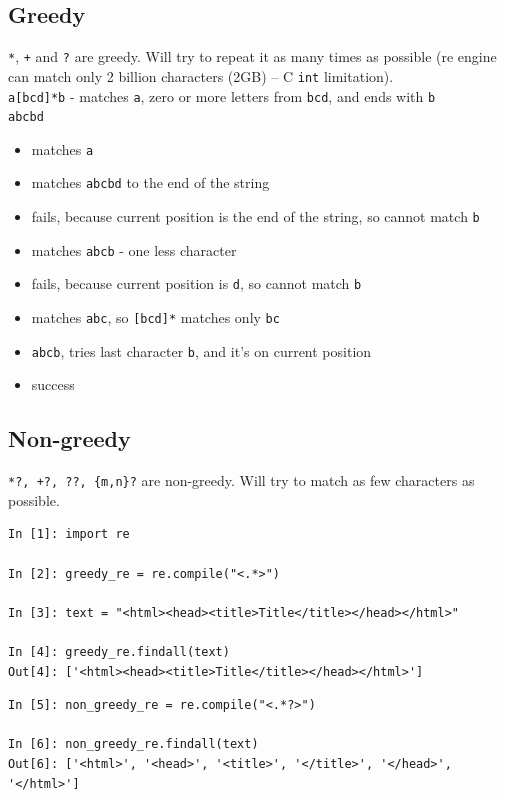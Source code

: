 \documentclass{beamer}
\begin{document}
\subsection{Greedy}
\begin{frame}[fragile]
\verb/*/, \verb/+/ and \verb/?/ are greedy. Will try to repeat it as many times as possible (re engine can match only 2 billion characters (2GB) -- C \verb/int/ limitation). \\
\pause
\verb/a[bcd]*b/ - matches \verb/a/, zero or more letters from \verb/bcd/, and ends with \verb/b/ \\
\pause
\verb/abcbd/
\pause
\begin{itemize}
\item matches \verb/a/
\pause
\item matches \verb/abcbd/ to the end of the string
\pause
\item fails, because current position is the end of the string, so cannot match \verb/b/
\pause
\item matches \verb/abcb/ - one less character
\pause
\item fails, because current position is \verb/d/, so cannot match \verb/b/
\pause
\item matches \verb/abc/, so \verb/[bcd]*/ matches only \verb/bc/
\pause
\item \verb/abcb/, tries last character \verb/b/, and it's on current position
\pause
\item success
\end{itemize}
\end{frame}

\subsection{Non-greedy}
\begin{frame}[fragile]
\verb/*?, +?, ??, {m,n}?/ are non-greedy. Will try to match as few characters as possible.
\pause

\begin{lstlisting}
In [1]: import re

In [2]: greedy_re = re.compile("<.*>")

In [3]: text = "<html><head><title>Title</title></head></html>"

In [4]: greedy_re.findall(text)
Out[4]: ['<html><head><title>Title</title></head></html>']
\end{lstlisting}
\pause

\begin{lstlisting}
In [5]: non_greedy_re = re.compile("<.*?>")

In [6]: non_greedy_re.findall(text)
Out[6]: ['<html>', '<head>', '<title>', '</title>', '</head>', '</html>']
\end{lstlisting}

\end{frame}
\end{document}
